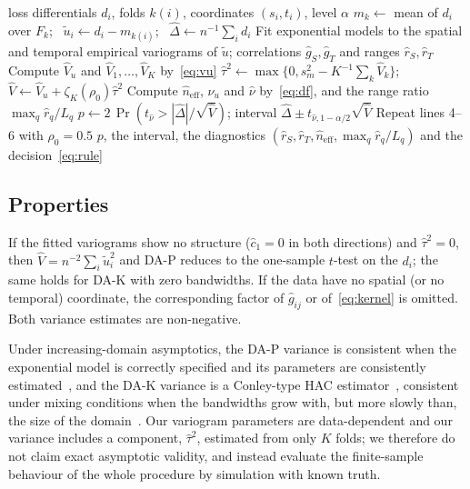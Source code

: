 \begin{algorithm}[t]
\caption{DA-P test for $H_0:\Delta_n=0$}\label{alg:dahac}
\begin{algorithmic}[1]
\Require loss differentials $d_i$, folds $k(i)$, coordinates $(s_i,t_i)$, level $\alpha$
\State $m_k\gets$ mean of $d_i$ over $F_k$; \ $\tilde u_i\gets d_i-m_{k(i)}$; \ $\hat\Delta\gets n^{-1}\sum_i d_i$
\State Fit exponential models to the spatial and temporal empirical variograms of $\tilde u$; correlations $\hat g_S,\hat g_T$ and ranges $\hat r_S,\hat r_T$
\State Compute $\hat V_u$ and $\hat V_1,\dots,\hat V_K$ by~\eqref{eq:vu} 
\State $\hat\tau^2\gets\max\{0,s_m^2-K^{-1}\sum_k\hat V_k\}$; \ $\hat V\gets\hat V_u+\zeta_K(\rho_0)\hat\tau^2$ 
\State Compute $\hat n_{\mathrm{eff}}$, $\nu_u$ and $\hat\nu$ by~\eqref{eq:df}, and the range ratio $\max_q\hat r_q/L_q$
\State $p\gets2\,\Pr(t_{\hat\nu}>|\hat\Delta|/\sqrt{\hat V})$; interval $\hat\Delta\pm t_{\hat\nu,1-\alpha/2}\sqrt{\hat V}$
\State Repeat lines 4--6 with $\rho_0=0.5$
\State \Return $p$, the interval, the diagnostics $(\hat r_S,\hat r_T,\hat n_{\mathrm{eff}},\max_q\hat r_q/L_q)$ and the decision~\eqref{eq:rule}
\end{algorithmic}
\end{algorithm}

\subsection{Properties}

\begin{remark}
If the fitted variograms show no structure ($\hat c_1=0$ in both directions) and $\hat\tau^2=0$, then $\hat V=n^{-2}\sum_i\tilde u_i^2$ and DA-P reduces to the one-sample $t$-test on the $d_i$; the same holds for DA-K with zero bandwidths. If the data have no spatial (or no temporal) coordinate, the corresponding factor of $\hat g_{ij}$ or of~\eqref{eq:kernel} is omitted. Both variance estimates are non-negative.
\end{remark}

\begin{remark}[Consistency]
Under increasing-domain asymptotics, the DA-P variance is consistent when the exponential model is correctly specified and its parameters are consistently estimated~\cite{cressie1993}, and the DA-K variance is a Conley-type HAC estimator~\cite{conley1999}, consistent under mixing conditions when the bandwidths grow with, but more slowly than, the size of the domain~\cite{andrews1991}. Our variogram parameters are data-dependent and our variance includes a component, $\hat\tau^2$, estimated from only $K$ folds; we therefore do not claim exact asymptotic validity, and instead evaluate the finite-sample behaviour of the whole procedure by simulation with known truth.
\end{remark}

